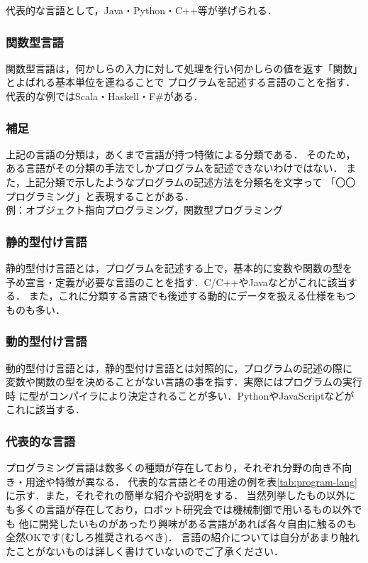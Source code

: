 \documentclass[autodetect-engine,dvi=dvipdfmx,ja=standard,a4j]{bxjsarticle}
\begin{document}
代表的な言語として，Java・Python・C++等が挙げられる．

\subsubsection{関数型言語}
関数型言語は，何かしらの入力に対して処理を行い何かしらの値を返す「関数」とよばれる基本単位を連ねることで
プログラムを記述する言語のことを指す．代表的な例ではScala・Haskell・F\#がある．

\subsubsection{補足}
上記の言語の分類は，あくまで言語が持つ特徴による分類である．
そのため，ある言語がその分類の手法でしかプログラムを記述できないわけではない．
また，上記分類で示したようなプログラムの記述方法を分類名を文字って
「〇〇プログラミング」と表現することがある．\\
例：オブジェクト指向プログラミング，関数型プログラミング

\subsubsection{静的型付け言語}
静的型付け言語とは，プログラムを記述する上で，基本的に変数や関数の型を
予め宣言・定義が必要な言語のことを指す．C/C++やJavaなどがこれに該当する．
また，これに分類する言語でも後述する動的にデータを扱える仕様をもつものも多い．

\subsubsection{動的型付け言語}
動的型付け言語とは，静的型付け言語とは対照的に，プログラムの記述の際に
変数や関数の型を決めることがない言語の事を指す．実際にはプログラムの実行時
に型がコンパイラにより決定されることが多い．PythonやJavaScriptなどがこれに該当する．

\subsubsection{代表的な言語} \label{program-lang-example}

プログラミング言語は数多くの種類が存在しており，それぞれ分野の向き不向き・用途や特徴が異なる．
代表的な言語とその用途の例を表\ref{tab:program-lang}に示す．また，それぞれの簡単な紹介や説明をする．
当然列挙したもの以外にも多くの言語が存在しており，ロボット研究会では機械制御で用いるもの以外でも
他に開発したいものがあったり興味がある言語があれば各々自由に触るのも全然OKです(むしろ推奨されるべき)．
言語の紹介については自分があまり触れたことがないものは詳しく書けていないのでご了承ください．
\end{document}
